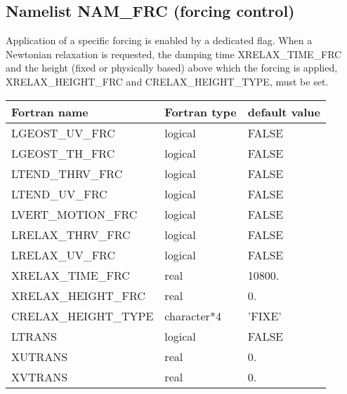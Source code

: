 \subsection{Namelist NAM\_FRC (forcing control)}

Application of a specific forcing is enabled by a dedicated flag. When a
Newtonian relaxation is requested, the damping time XRELAX\_TIME\_FRC and the
height (fixed or physically based) above which the forcing is applied,
XRELAX\_HEIGHT\_FRC and CRELAX\_HEIGHT\_TYPE, must be set.

\begin{center}
\begin{tabular} {|l|l|l|}
\hline
Fortran name & Fortran type & default value \\
\hline
LGEOST\_UV\_FRC      & logical      & FALSE \\
LGEOST\_TH\_FRC      & logical      & FALSE \\
LTEND\_THRV\_FRC     & logical      & FALSE \\
LTEND\_UV\_FRC     & logical      & FALSE \\
LVERT\_MOTION\_FRC   & logical      & FALSE \\
LRELAX\_THRV\_FRC    & logical      & FALSE \\
LRELAX\_UV\_FRC      & logical      & FALSE \\
XRELAX\_TIME\_FRC    & real         & 10800. \\
XRELAX\_HEIGHT\_FRC  & real         & 0. \\
CRELAX\_HEIGHT\_TYPE &  character*4 & 'FIXE' \\
LTRANS               & logical      & FALSE \\
XUTRANS              & real         & 0. \\
XVTRANS              & real         & 0. \\
\hline
\end{tabular}
\end{center}

